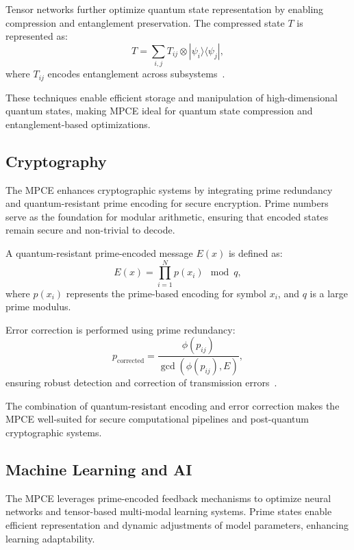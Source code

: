 \documentclass{article}
\theoremstyle{plain}
\begin{document}
Tensor networks further optimize quantum state representation by enabling compression and entanglement preservation. The compressed state \( T \) is represented as:
\begin{equation}
    T = \sum_{i,j} T_{ij} \otimes |\psi_i \rangle \langle \psi_j|,
\end{equation}
where \( T_{ij} \) encodes entanglement across subsystems~\cite{vidal2003efficient, white1992tensor}.

These techniques enable efficient storage and manipulation of high-dimensional quantum states, making MPCE ideal for quantum state compression and entanglement-based optimizations.

\subsection{Cryptography}

The MPCE enhances cryptographic systems by integrating prime redundancy and quantum-resistant prime encoding for secure encryption. Prime numbers serve as the foundation for modular arithmetic, ensuring that encoded states remain secure and non-trivial to decode.

A quantum-resistant prime-encoded message \( E(x) \) is defined as:
\begin{equation}
    E(x) = \prod_{i=1}^N p(x_i) \mod q,
\end{equation}
where \( p(x_i) \) represents the prime-based encoding for symbol \( x_i \), and \( q \) is a large prime modulus.

Error correction is performed using prime redundancy:
\begin{equation}
    p_{\text{corrected}} = \frac{\phi(p_{ij})}{\gcd(\phi(p_{ij}), E)},
\end{equation}
ensuring robust detection and correction of transmission errors~\cite{haroche2013nobel, shor1994algorithms}.

The combination of quantum-resistant encoding and error correction makes the MPCE well-suited for secure computational pipelines and post-quantum cryptographic systems.

\subsection{Machine Learning and AI}

The MPCE leverages prime-encoded feedback mechanisms to optimize neural networks and tensor-based multi-modal learning systems. Prime states enable efficient representation and dynamic adjustments of model parameters, enhancing learning adaptability.
\end{document}
